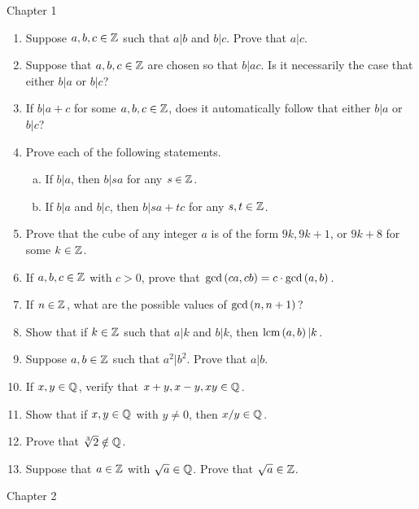 \documentclass[11pt,fleqn,dvipsnames,usenames]{article}
\renewcommand{\headrulewidth}{1pt}
\begin{document}
\fancyhead[L]{\course}
\fancyhead[R]{\term}
\renewcommand{\headrulewidth}{0.4pt}

{\huge Chapter 1}
\vsp

\begin{enumerate}
\item Suppose $a,b,c\in\mathbb{Z}$ such that $a|b$ and $b|c$.  Prove that $a|c$.
\item Suppose that $a,b,c\in\mathbb{Z}$ are chosen so that $b|ac$.  Is it necessarily the case that either $b|a$ or $b|c$?
\item If $b|a+c$ for some $a,b,c\in \mathbb{Z}$, does it automatically follow that either $b|a$ or $b|c$? 
\item Prove each of the following statements.
\begin{enumerate}[(a)]
\item If $b|a$, then $b|sa$ for any $s\in\mathbb{Z}$.
\item If $b|a$ and $b|c$, then $b|sa+tc$ for any $s,t\in\mathbb{Z}$.
\end{enumerate}
\item Prove that the cube of any integer $a$ is of the form $9k, 9k+1$, or $9k+8$ for some $k\in\mathbb{Z}$.
\item If $a,b,c\in\mathbb{Z}$ with $c>0$, prove that $\text{gcd}\left(ca,cb\right) = c\cdot \text{gcd}\left(a,b\right)$.
\item If $n\in \mathbb{Z}$, what are the possible values of $\text{gcd}\left(n, n+1\right)$?
\item Show that if $k\in\mathbb{Z}$ such that $a|k$ and $b|k$, then $\text{lcm}\left(a, b\right)|k$.
\item Suppose $a,b\in\mathbb{Z}$ such that $a^2|b^2$.  Prove that $a|b$.
\item If $x,y\in\mathbb{Q}$, verify that $x+y, x-y, xy\in \mathbb{Q}$.
\item Show that if $x,y\in\mathbb{Q}$ with $y\neq 0$, then $x/y\in\mathbb{Q}$.
\item Prove that $\sqrt[3]{2}\notin\mathbb{Q}$.
\item Suppose that $a\in\mathbb{Z}$ with $\sqrt{a}\in \mathbb{Q}$.  Prove that $\sqrt{a}\in\mathbb{Z}$.
\end{enumerate}
\vsp

{\huge Chapter 2}
\vsp
\end{document}
